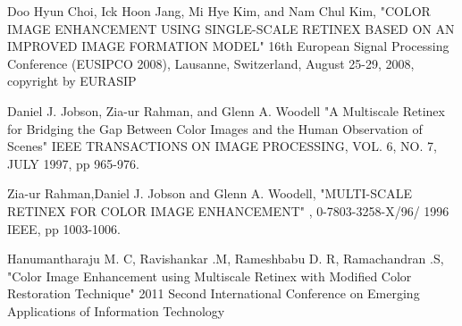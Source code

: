 \begin{thebibliography}{111}
	 Doo Hyun Choi, Ick Hoon Jang, Mi Hye Kim, and Nam Chul Kim, "COLOR IMAGE ENHANCEMENT 
	USING SINGLE-SCALE RETINEX BASED ON AN IMPROVED IMAGE FORMATION MODEL" 16th European Signal 
	Processing Conference (EUSIPCO 2008), Lausanne, Switzerland, August 25-29, 2008, copyright by 
	EURASIP
	
	 Daniel J. Jobson, Zia-ur Rahman, and Glenn A. Woodell "A Multiscale Retinex for 
	Bridging the Gap Between Color Images and the Human Observation of Scenes" IEEE TRANSACTIONS ON 
	IMAGE PROCESSING, VOL. 6, NO. 7, JULY 1997, pp 965-976.

	 Zia-ur Rahman,Daniel J. Jobson and Glenn A. Woodell, "MULTI-SCALE RETINEX FOR COLOR 
	IMAGE ENHANCEMENT" , 0-7803-3258-X/96/ 1996 IEEE, pp 1003-1006.

	 Hanumantharaju M. C, Ravishankar .M, Rameshbabu D. R, Ramachandran .S, "Color Image 
	Enhancement using Multiscale Retinex with Modified Color Restoration Technique" 2011 Second
	International Conference on Emerging Applications of Information Technology

	




\end{thebibliography}